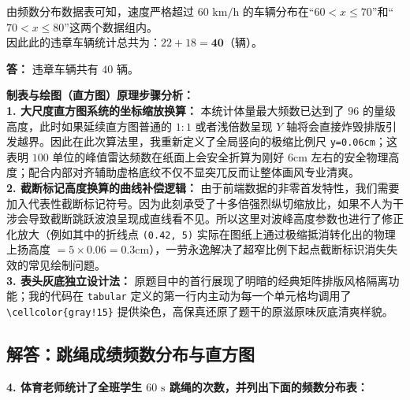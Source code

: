 \vspace{0.2cm}

由频数分布数据表可知，速度严格超过 $60\text{ km/h}$ 的车辆分布在“$60 < x \leqslant 70$”和“$70 < x \leqslant 80$”这两个数据组内。\\
因此此的违章车辆统计总共为：$22 + 18 = \boldsymbol{40}$（辆）。

\textbf{答：} 违章车辆共有 $40$ 辆。

\vspace{0.6cm}

{\small\color{blue!70!black}
\textbf{制表与绘图（直方图）原理步骤分析：}\\
\textbf{1. 大尺度直方图系统的坐标缩放换算：} 本统计体量最大频数已达到了 $96$ 的量级高度，此时如果延续直方图普通的 $1:1$ 或者浅倍数呈现 $Y$ 轴将会直接炸毁排版引发越界。因此在此次算法里，我重新定义了全局竖向的极缩比例尺 \texttt{y=0.06cm}；这表明 $100$ 单位的峰值雷达频数在纸面上会安全折算为刚好 $6\text{cm}$ 左右的安全物理高度；配合内部对齐辅助虚格底纹不仅不显突兀反而让整体画风专业清爽。\\
\textbf{2. 截断标记高度换算的曲线补偿逻辑：} 由于前端数据的非零首发特性，我们需要加入代表性截断标记符号。因为此刻承受了十多倍强烈纵切缩放比，如果不人为干涉会导致截断跳跃波浪呈现成直线看不见。所以这里对波峰高度参数也进行了修正化放大（例如其中的折线点 \texttt{(0.42, 5)} 实际在图纸上通过极缩抵消转化出的物理上扬高度 $= 5 \times 0.06 = 0.3\text{cm}$），一劳永逸解决了超窄比例下起点截断标识消失失效的常见绘制问题。\\
\textbf{3. 表头灰底独立设计法：} 原题目中的首行展现了明暗的经典矩阵排版风格隔离功能；我的代码在 \texttt{tabular} 定义的第一行内主动为每一个单元格均调用了 \texttt{\textbackslash cellcolor\{gray!15\}} 提供染色，高保真还原了题干的原滋原味灰底清爽样貌。
}

\newpage

\newpage

\subsection{解答：跳绳成绩频数分布与直方图}

\vspace{0.6cm}

\textbf{4. 体育老师统计了全班学生 $60\text{ s}$ 跳绳的次数，并列出下面的频数分布表：}

